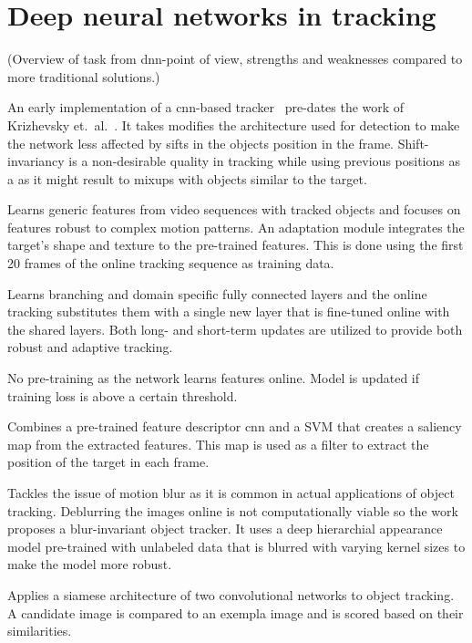 \section{Deep neural networks in tracking}
(Overview of task from \ac{dnn}-point of view, strengths and weaknesses compared to
more traditional solutions.)

An early implementation of a \ac{cnn}-based tracker~\cite{HUMAN_CNN} pre-dates the work
of Krizhevsky et.~al.~\cite{NIPS_IMAGENET}. It takes modifies the architecture used for
detection to make the network less affected by sifts in the objects position in the
frame. Shift-invariancy is a non-desirable quality in tracking while using previous
positions as a as it might result to mixups with objects similar to the target.~\cite{HUMAN_CNN}

\cite{LEARNED_HIERARCH}
Learns generic features from video sequences with tracked objects and focuses on
features robust to complex motion patterns. An adaptation module integrates the
target's shape and texture to the pre-trained features. This is done using the
first 20 frames of the online tracking sequence as training data.

\cite{MULTI_DOMAIN}
Learns branching and domain specific fully connected layers and the online tracking
substitutes them with a single new layer that is fine-tuned online with the shared
layers. Both long- and short-term updates are utilized to provide both robust and
adaptive tracking.

\cite{DEEPTRACK}
No pre-training as the network learns features online. Model is updated if training
loss is above a certain threshold.

\cite{DISCR_SALIENCY}
Combines a pre-trained feature descriptor \ac{cnn} and a SVM that creates a
saliency map from the extracted features. This map is used as a filter to extract
the position of the target in each frame.

\cite{BLUR_TRACK}
Tackles the issue of motion blur as it is common in actual applications of object
tracking. Deblurring the images online is not computationally viable so the work
proposes a blur-invariant object tracker. It uses a deep hierarchial appearance
model pre-trained with unlabeled data that is blurred with varying kernel sizes
to make the model more robust. 

\cite{SIAM_TRACK}
Applies a siamese architecture of two convolutional networks to object tracking.
A candidate image is compared to an exempla image and is scored based on their
similarities.

